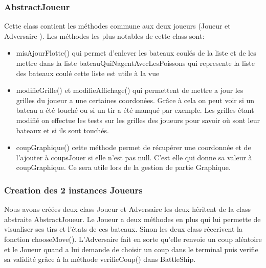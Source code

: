 \documentclass[a4paper,12pt]{article} %
\begin{document}
\subsubsection{AbstractJoueur}
Cette class contient les méthodes commune aux deux joueurs (Joueur et Adversaire ). Les méthodes les plus notables de cette class sont:
\begin{itemize}
\item misAjourFlotte() qui permet d'enlever les bateaux coulés de la liste et de les mettre dans la liste bateauQuiNagentAvecLesPoissons qui represente la liste des bateaux coulé cette liste est utile à la vue
\item modifieGrille() et modifieAffichage() qui permettent de mettre a jour les grilles du joueur a une certaines coordonées. Grâce à cela on peut voir si un bateau a été touché ou si un tir a été manqué par exemple. Les grilles étant modifié on effectue les tests sur les grilles des joueurs pour savoir où sont leur bateaux et si ils sont touchés.
\item coupGraphique() cette méthode permet de récupérer une coordonnée et de l'ajouter à coupsJouer si elle n'est pas null. C'est elle qui donne sa valeur à coupGraphique. Ce  sera utile lors de la
gestion de partie Graphique. 
\end{itemize}
\subsubsection{Creation des 2 instances Joueurs}
Nous avons créées deux class Joueur et Adversaire les deux héritent de la class abstraite AbstractJoueur. Le Joueur a deux méthodes en plus qui lui permette de visualiser ses tirs et l'états de ces bateaux. Sinon les deux class réecrivent la fonction chooseMove(). L'Adversaire fait en sorte qu'elle renvoie un coup aléatoire et le Joueur quand a lui demande de choisir un coup dans le terminal
puis verifie sa validité grâce à la méthode verifieCoup() dans BattleShip.
\end{document}
